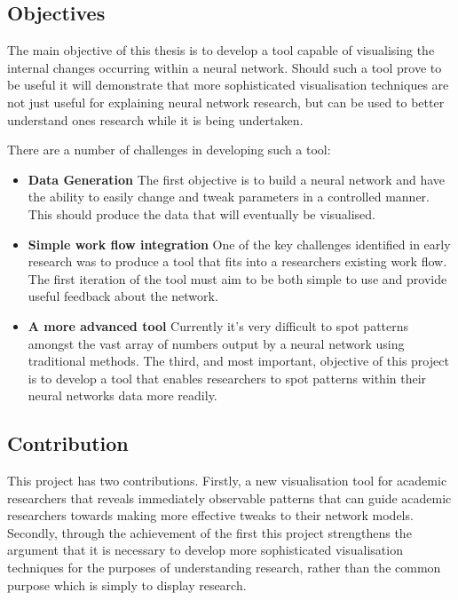 \documentclass[a4paper,11pt,titlepage]{article}
\begin{document}
	\subsection{Objectives}
	The main objective of this thesis is to develop a tool capable of visualising the internal changes occurring within a neural network. Should such a tool prove to be useful it will demonstrate that more sophisticated visualisation techniques are not just useful for explaining neural network research, but can be used to better understand ones research while it is being undertaken.
	\par 
	There are a number of challenges in developing such a tool:
		\begin{itemize}
			\item \textbf{Data Generation} The first objective is to build a neural network and have the ability to easily change and tweak parameters in a controlled manner. This should produce the data that will eventually be visualised.
			\item \textbf{Simple work flow integration} One of the key challenges identified in early research was to produce a tool that fits into a researchers existing work flow. The first iteration of the tool must aim to be both simple to use and provide useful feedback about the network. 
			\item \textbf{A more advanced tool} Currently it's very difficult to spot patterns amongst the vast array of numbers output by a neural network using traditional methods. The third, and most important, objective of this project is to develop a tool that enables researchers to spot patterns within their neural networks data more readily.
		\end{itemize}

	\subsection{Contribution}
	This project has two contributions. Firstly, a new visualisation tool for academic researchers that reveals immediately observable patterns that can guide academic researchers towards making more effective tweaks to their network models. Secondly, through the achievement of the first this project strengthens the argument that it is necessary to develop more sophisticated visualisation techniques for the purposes of understanding research, rather than the common purpose which is simply to display research.
	
\end{document}
